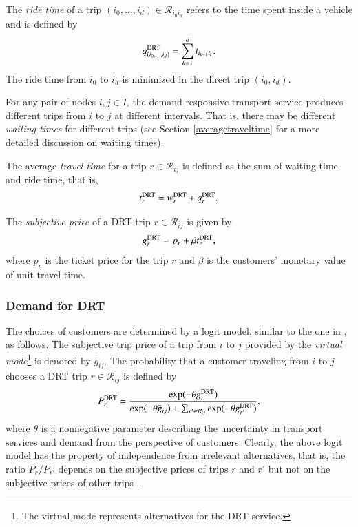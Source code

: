 \documentclass[dissertation,draft*]{aaltoseries}
\begin{document}
The \emph{ride time} of a trip $(i_0,\ldots,i_d) \in \mathcal{R}_{i_0i_d}$ 
refers to the time spent inside a vehicle and is defined by
\begin{align}
\label{ridetime}
q_{(i_0,\ldots,i_d)}^{\rm DRT} = \sum_{k=1}^{d} t_{i_{k-1}i_{k}}.
\end{align}
The ride time from $i_0$ to $i_d$ is minimized in the direct trip $(i_0,i_d)$. 

For any pair of nodes $i,j \in I$,
the demand responsive transport service produces different trips from $i$ to $j$ at different intervals.
That is, there may be different \emph{waiting times} for different trips
(see Section \ref{averagetraveltime} for a more detailed discussion on waiting times).

The average \emph{travel time} for a trip $r \in \mathcal{R}_{ij}$ is defined as
the sum of waiting time and ride time, that is, 
\begin{align}
\label{traveltime}
t_{r}^{\rm DRT} = w_{r}^{\rm DRT} + q_{r}^{\rm DRT}.
\end{align}

The \emph{subjective price} of a DRT trip $r \in \mathcal{R}_{ij}$ is given by
\begin{align}
\label{asiakashinta}
g_{r}^{\rm DRT} = p_{r} + \beta t_{r}^{\rm DRT},
\end{align}
where $p_{r}$ is the ticket price for the trip $r$ and $\beta$ is the customers' 
monetary value of unit travel time. 

\subsubsection{Demand for DRT}
The choices of customers are determined by a logit model, similar to the one in \citep{yang2010}, as follows.
The subjective trip price of a trip from $i$ to $j$ provided by the \emph{virtual mode}\footnote{The virtual mode 
represents alternatives for the DRT service.} is denoted by $\bar{g}_{ij}$.
The probability that a customer traveling from $i$ to $j$ chooses a DRT trip $r \in \mathcal{R}_{ij}$ is defined by
\begin{align}
\label{kysyntatn}
P_{r}^{\rm DRT} = 
\frac{\exp(-\theta g_{r}^{\rm DRT})}{\exp(-\theta \bar{g}_{ij}) + \sum_{r' \in \mathcal{R}_{ij}}\exp(-\theta g_{r'}^{\rm DRT})},
\end{align}
where $\theta$ is a nonnegative parameter describing the uncertainty in transport services and demand
from the perspective of customers.  
Clearly, the above logit model has the property of independence from irrelevant alternatives, that is, 
the ratio $P_{r}/P_{r'}$ depends on the subjective prices of trips $r$ and $r'$ but
not on the subjective prices of other trips \citep{small2007}.
 
\end{document}
